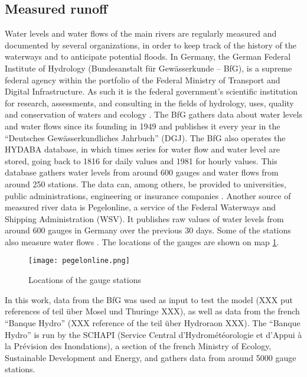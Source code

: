\subsection{Measured runoff}
\label{meas_runoff}
Water levels and water flows of the main rivers are regularly measured and documented by several organizations, in order to keep track of the history of the waterways and to anticipate potential floods. In Germany, the German Federal Institute of Hydrology (Bundesanstalt für Gewässerkunde – BfG), is a supreme federal agency within the portfolio of the Federal Ministry of Transport and Digital Infrastructure. As such it is the federal government's scientific institution for research, assessments, and consulting in the fields of hydrology, uses, quality and conservation of waters and ecology \cite{bafg}. The BfG gathers data about water levels and water flows since its founding in 1949 and publishes it every year in the ``Deutsches Gewässerkundliches Jahrbuch'' (DGJ). The BfG also operates the HYDABA database, in which times series for water flow and water level are stored, going back to 1816 for daily values and 1981 for hourly values. This database gathers water levels from around 600 gauges and water flows from around 250 stations. The data can, among others, be provided to universities, public administrations, engineering or insurance companies \cite{bafg_hyd}. \newline
Another source of measured river data is Pegelonline, a service of the Federal Waterways and Shipping Administration (WSV). It publishes raw values of water levels from around 600 gauges in Germany over the previous 30 days. Some of the stations also measure water flows \cite{pegelonline}. The locations of the gauges are shown on map \ref{pegelonline}.

\begin{figure}[H]
\centering
\texttt{[image: pegelonline.png]}
\caption[Locations of the gauge stations]{Locations of the gauge stations \cite{pegelonline}}
\label{pegelonline}
\end{figure}

In this work, data from the BfG was used as input to test the model (XXX put references of teil über Mosel und Thuringe XXX), as well as data from the french ``Banque Hydro'' (XXX reference of the teil über Hydroraon XXX). The ``Banque Hydro'' is run by the SCHAPI (Service Central d'Hydrométéorologie et d'Appui à la Prévision des Inondations), a section of the french Ministry of Ecology, Sustainable Development and Energy, and gathers data from around 5000 gauge stations.

